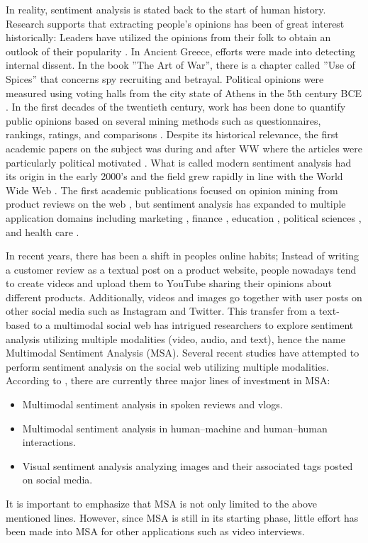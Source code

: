 In reality, sentiment analysis is stated back to the start of human history. Research supports that extracting people's opinions has been of great interest historically: Leaders have utilized the opinions from their folk to obtain an outlook of their popularity \cite{SA-history-MANTYLA201816}. In Ancient Greece, efforts were made into detecting internal dissent. In the book ''The Art of War'', there is a chapter called ''Use of Spices'' that concerns spy recruiting and betrayal. Political opinions were measured using voting halls from the city state of Athens in the 5th century BCE \cite{ATHEN-voting-thorley2012athenian}.  In the first decades of the twentieth century, work has been done to quantify public opinions based on several mining methods such as questionnaires, rankings, ratings, and comparisons \cite{mining-methods-droba1931methods}. Despite its historical relevance, the first academic papers on the subject was during and after WW\MakeUppercase{} where the articles were particularly political motivated \cite{SA-history-MANTYLA201816}. What is called modern sentiment analysis had its origin in the early 2000's and the field grew rapidly in line with the World Wide Web \cite{deep-learning-WIRE}. The first academic publications focused on opinion mining from product reviews on the web \cite{describe-polarity-dave2003mining}, but sentiment analysis has expanded to multiple application domains including marketing \cite{marketing-sa-rambocas2018online}, finance \cite{stock_price1}, education \cite{education_domain}, political sciences \cite{political-science-sa-rice2021corpus}, and health care \cite{healthcare-sa-gohil2018sentiment}. 

In recent years, there has been a shift in peoples online habits; Instead of writing a customer review as a textual post on a product website, people nowadays tend to create videos and upload them to YouTube sharing their opinions about different products. Additionally, videos and images go together with user posts on other social media such as Instagram and Twitter. This transfer from a text-based to a multimodal social web has intrigued researchers to explore sentiment analysis utilizing multiple modalities (video, audio, and text), hence the name Multimodal Sentiment Analysis (MSA). Several recent studies have attempted to perform sentiment analysis on the social web utilizing multiple modalities. According to \cite{MSA_review1_SOLEYMANI20173}, there are currently three major lines of investment in MSA: 
%
\begin{itemize}
    \item Multimodal sentiment analysis in spoken reviews and vlogs.
    \item Multimodal sentiment analysis in human–machine and human–human interactions.
    \item Visual sentiment analysis analyzing images and their associated tags posted on social media.
\end{itemize}
%
It is important to emphasize that MSA is not only limited to the above mentioned lines. However, since MSA is still in its starting phase, little effort has been made into MSA for other applications such as video interviews. \\


